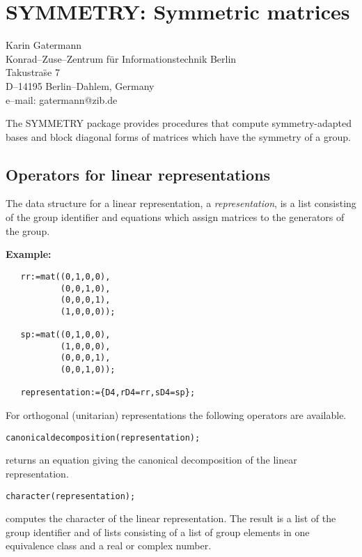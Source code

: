 \chapter{SYMMETRY: Symmetric matrices}
\label{SYMMETRY}

{\footnotesize
\begin{center}
Karin Gatermann\\
Konrad--Zuse--Zentrum f\"ur Informationstechnik Berlin \\
Takustra\"se 7 \\
D--14195 Berlin--Dahlem, Germany \\[0.05in]
e--mail: gatermann@zib.de
\end{center}
}

The SYMMETRY package provides procedures
that compute symmetry-adapted bases and block diagonal forms
of matrices which have the symmetry of a group.

\section{Operators for linear representations}

The data structure for a linear representation, a {\em
representation}, is a list consisting of the group identifier and
equations which assign matrices to the generators of the group.

{\bf Example:}
\begin{verbatim}
   rr:=mat((0,1,0,0),
           (0,0,1,0),
           (0,0,0,1),
           (1,0,0,0));

   sp:=mat((0,1,0,0),
           (1,0,0,0),
           (0,0,0,1),
           (0,0,1,0));

   representation:={D4,rD4=rr,sD4=sp};
\end{verbatim}

For orthogonal (unitarian) representations the following operators
are available.

{\tt canonicaldecomposition(representation);}

returns an equation giving the canonical decomposition of the linear
representation.

{\tt character(representation);}

computes the character of the linear representation. The result is a list
of the group identifier and of lists consisting of a 
list of group elements in one equivalence class and a real or complex number.

